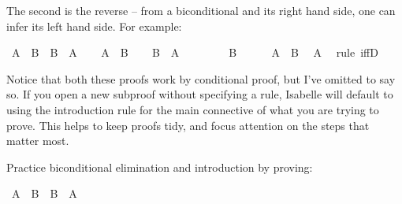 \begin{isabellebody}
\begin{isamarkuptext}
The second is the reverse -- from a biconditional and its right hand side, one can infer
its left hand side. For example:%
\end{isamarkuptext}\isamarkuptrue%
\isamarkupfalse%
\ {\isachardoublequoteopen}{\isacharparenleft}A\ {\isasymlongleftrightarrow}\ B{\isacharparenright}\ {\isasymlongrightarrow}\ B\ {\isasymlongrightarrow}\ A{\isachardoublequoteclose}\isanewline
%
\isadelimproof
%
\endisadelimproof
%
\isatagproof
{}\isamarkupfalse%
\isanewline
\ \ \isamarkupfalse%
\ {\isachardoublequoteopen}A\ {\isasymlongleftrightarrow}\ B{\isachardoublequoteclose}\isanewline
\ \ \isamarkupfalse%
\ {\isachardoublequoteopen}B\ {\isasymlongrightarrow}\ A{\isachardoublequoteclose}\isanewline
\ \ \isamarkupfalse%
\isanewline
\ \ \ \ \isamarkupfalse%
\ {\isachardoublequoteopen}B{\isachardoublequoteclose}\isanewline
\ \ \ \ \isamarkupfalse%
\ {\isacharbackquoteopen}A\ {\isasymlongleftrightarrow}\ B{\isacharbackquoteclose}\ \isamarkupfalse%
\ {\isachardoublequoteopen}A{\isachardoublequoteclose}\ \isamarkupfalse%
\ {\isacharparenleft}rule\ iffD{}{\isacharparenright}\isanewline
\ \ \isamarkupfalse%
\isanewline
{}\isamarkupfalse%
%
\endisatagproof
{\isafoldproof}%
%
\isadelimproof
%
\endisadelimproof
%
\begin{isamarkuptext}%
Notice that both these proofs work by conditional proof, but I've omitted to say so. If you
open a new subproof without specifying a rule, Isabelle will default to using the introduction rule
for the main connective of what you are trying to prove. This helps to keep proofs tidy, and focus
attention on the steps that matter most.%
\end{isamarkuptext}\isamarkuptrue%
%
\begin{isamarkuptext}%
\begin{Exercise}[label = biconditional] 
Practice biconditional elimination and introduction by proving: \end{Exercise}%
\end{isamarkuptext}\isamarkuptrue%
\isamarkupfalse%
\ {\isachardoublequoteopen}{\isacharparenleft}A\ {\isasymlongleftrightarrow}\ B{\isacharparenright}\ {\isasymlongleftrightarrow}\ {\isacharparenleft}B\ {\isasymlongleftrightarrow}\ A{\isacharparenright}{\isachardoublequoteclose}%
\isadelimproof
\ %
\endisadelimproof
%
\isatagproof
{}\isamarkupfalse%

\end{isabellebody}
